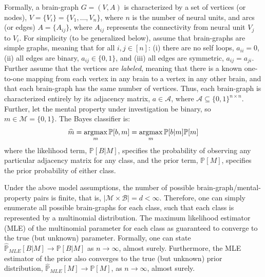 \documentclass{article}
\newcommand{\conv}{\rightarrow}
\newcommand{\PP}{\mathbb{P}}           %
\providecommand{\mc}[1]{\mathcal{#1}}
\providecommand{\mh}[1]{\widehat{#1}}
\newcommand{\argmax}{\operatornamewithlimits{argmax}}
\begin{document}
Formally, a brain-graph $G=(V,A)$ is characterized by a set of vertices (or nodes), $V = \{V_i\} = \{V_1,\ldots, V_n\}$, where $n$ is the number of neural units, and arcs (or edges) $A=\{A_{ij}\}$, where $A_{ij}$ represents the connectivity from neural unit $V_j$ to $V_i$. For simplicity (to be generalized below), assume that brain-graphs are simple graphs, meaning that for all $i,j \in [n]$: (i) there are no self loops, $a_{ii}=0$, (ii) all edges are binary, $a_{ij} \in \{0,1\}$, and (iii) all edges are symmetric,  $a_{ij}=a_{ji}$.  Further assume that the vertices are \emph{labeled}, meaning that there is a known one-to-one mapping from each vertex in any brain to a vertex in any other brain, and that each brain-graph has the same number of vertices.  Thus, each brain-graph is characterized entirely by its adjacency matrix, $a \in \mc{A}$, where $\mc{A} \subseteq \{0,1\}^{n \times n}$. Further, let the mental property under investigation be binary, so $m \in \mc{M} = \{0,1\}$.  The Bayes classifier is:
\begin{align}
	\mh{m} = \argmax_m \PP[b,m] = \argmax_m \PP[b|m] \PP[m] 
\end{align}
where the likelihood term, $\PP[B|M]$, specifies the probability of observing any particular adjacency matrix for any class, and the prior term, $\PP[M]$, specifies the prior probability of either class.  

Under the above model assumptions, the number of possible brain-graph/mental-property pairs is finite, that is, $|\mc{M} \times \mc{B}| = d < \infty$.  Therefore, one can simply enumerate all possible brain-graphs for each class, such that each class is represented by a multinomial distribution.  The maximum likelihood estimator (MLE) of the multinomial parameter for each class as guaranteed to converge to the true (but unknown) parameter.  Formally, one can state $\mh{\PP}_{MLE}[B|M] \conv \PP[B|M]$ as $n \conv \infty$, almost surely.  Furthermore, the MLE  estimator of the prior also converges to the true (but unknown) prior distribution, $\mh{\PP}_{MLE}[M] \conv \PP[M]$, as $n \conv \infty$, almost surely.  
\end{document}
